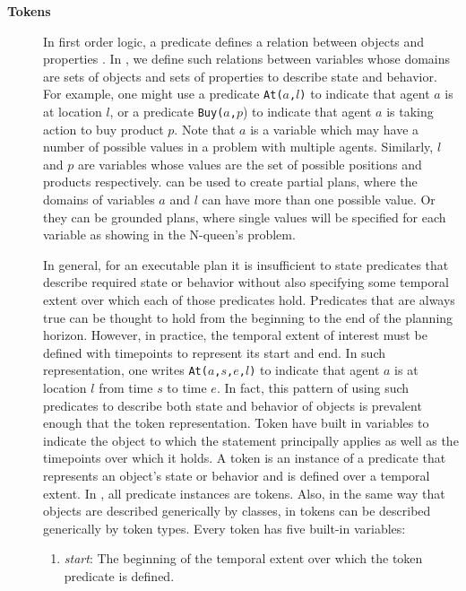 \begin{description}
\item[\textbf{Tokens}] In first order logic, a predicate defines a
  relation between objects and properties \cite{gen87}.  In \eu, we
  define such relations between variables whose domains are sets of
  objects and sets of properties to describe state and behavior. For
  example, one might use a predicate \texttt{At($a$,$l$)} to indicate
  that agent $a$ is at location $l$, or a predicate
  \texttt{Buy($a$,$p$}) to indicate that agent $a$ is taking action to
  buy product $p$. Note that $a$ is a variable which may have a number
  of possible values in a problem with multiple agents. Similarly, $l$
  and $p$ are variables whose values are the set of possible positions
  and products respectively. \eu can be used to create partial plans,
  where the domains of variables $a$ and $l$ can have more than one
  possible value. Or they can be grounded plans, where single values
  will be specified for each variable as showing in the N-queen's
  problem.

  In general, for an executable plan it is insufficient to state
  predicates that describe required state or behavior without also
  specifying some temporal extent over which each of those predicates
  hold. Predicates that are always true can be thought to hold from
  the beginning to the end of the planning horizon. However, in
  practice, the temporal extent of interest must be defined with
  timepoints \cite{Dean88} to represent its start and end.  In such
  representation, one writes \texttt{At($a$,$s$,$e$,$l$)} to indicate
  that agent $a$ is at location $l$ from time $s$ to time $e$. In
  fact, this pattern of using such predicates to describe both state
  and behavior of objects is prevalent enough that \eu the token
  representation. Token have built in variables to indicate the object
  to which the statement principally applies as well as the timepoints
  over which it holds. A token is an instance of a predicate that
  represents an object's state or behavior and is defined over a
  temporal extent. In \eu, all predicate instances are tokens. Also,
  in the same way that objects are described generically by classes,
  in \eu tokens can be described generically by token types. Every
  token has five built-in variables:

  \begin{enumerate}

  \item \textit {start}: The beginning of the temporal extent over
    which the token predicate is defined.


\end{enumerate}
\end{description}
